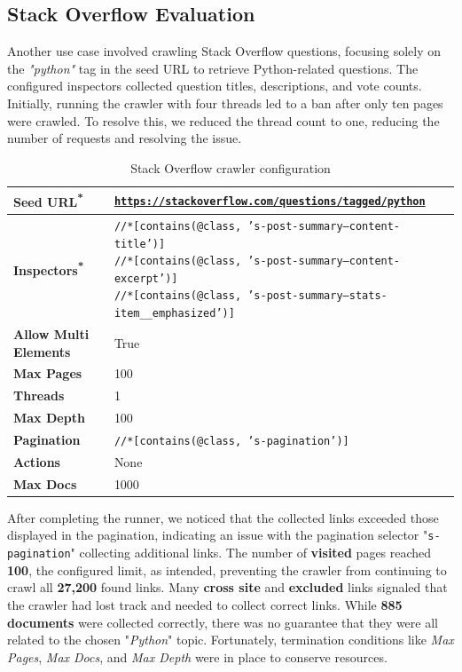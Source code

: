 {\subsection*{Stack Overflow Evaluation}

Another use case involved crawling Stack Overflow questions, focusing solely on the \textit{"python"} tag in the seed URL to retrieve Python-related questions. The configured inspectors collected question titles, descriptions, and vote counts. Initially, running the crawler with four threads led to a ban after only ten pages were crawled. To resolve this, we reduced the thread count to one, reducing the number of requests and resolving the issue.


\begin{table}[ht] 
\centering
{\footnotesize
\begin{tabular}{|P{2.5cm}|P{9.9cm}|}
 \hline
\textbf{Seed URL\textsuperscript{*}} & \href{https://stackoverflow.com/questions/tagged/python}{\texttt{https://stackoverflow.com/questions/tagged/python}}\T\B 
\\ 
\hline
\textbf{Inspectors\textsuperscript{*}} & \texttt{//*[contains(@class, 's-post-summary--content-title')]\T\B  \newline
//*[contains(@class, 's-post-summary--content-excerpt')]	
 \newline
//*[contains(@class, 's-post-summary--stats-item\_\_emphasized')]}	
\\ 
\hline \hline
\textbf{Allow Multi Elements} & True \T\B 
\\ 
\hline
\textbf{Max Pages} & 100\T\B 
\\ 
\hline
\textbf{Threads} & 1\T\B 
\\ 
\hline
\textbf{Max Depth} & 100\T\B 
\\ 
\hline
\textbf{Pagination} & \texttt{//*[contains(@class, 's-pagination')]}\T\B 
\\ 
\hline
\textbf{Actions} & None\T\B 
\\ 
\hline
\textbf{Max Docs} & 1000\T\B 
\\ 
\hline 
    \end{tabular}
}
  \captionsetup{justification=centering,margin=2cm}
  \caption{Stack Overflow crawler configuration}
  \label{table:crawler_conf_stack}
\end{table}


After completing the runner, we noticed that the collected links exceeded those displayed in the pagination, indicating an issue with the pagination selector "\texttt{s-pagination}" collecting additional links. The number of \textbf{visited} pages reached \textbf{100}, the configured limit, as intended, preventing the crawler from continuing to crawl all \textbf{27,200} found links. Many \textbf{cross site} and \textbf{excluded} links signaled that the crawler had lost track and needed to collect correct links. While \textbf{885 documents} were collected correctly, there was no guarantee that they were all related to the chosen "\textit{Python}" topic. Fortunately, termination conditions like \textit{Max Pages}, \textit{Max Docs}, and \textit{Max Depth} were in place to conserve resources.

}
